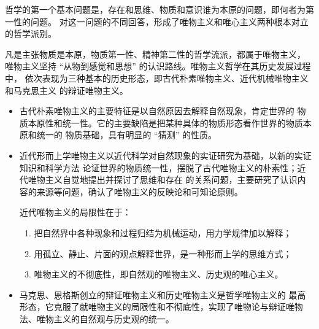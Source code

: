 \documentclass[utf-8, 10pt]{article}
\begin{document}
\vspace{1em}
{
哲学的第一个基本问题是，存在和思维、物质和意识谁为本原的问题，即何者为第一性的问题。
    对这一问题的不同回答，形成了唯物主义和唯心主义两种根本对立的哲学派别。
    
    
    凡是主张物质是本原，物质第一性、精神第二性的哲学流派，都属于唯物主义，
    唯物主义坚持 “从物到感觉和思想” 的认识路线。唯物主义哲学在其历史发展过程中，
    依次表现为三种基本的历史形态，即古代朴素唯物主义、近代机械唯物主义和马克思主义
    的辩证唯物主义。
    \begin{itemize}[itemsep=0pt]
        \item 古代朴素唯物主义的主要特征是以自然原因去解释自然现象，肯定世界的
        物质本原性和统一性。它的主要缺陷是把某种具体的物质形态看作世界的物质本原和统一的
        物质基础，具有明显的 “猜测” 的性质。
        \item 近代形而上学唯物主义以近代科学对自然现象的实证研究为基础，以新的实证知识和科学方法
        论证世界的物质统一性，摆脱了古代唯物主义的朴素性；近代唯物主义自觉地提出并探讨了思维和存在
        的关系问题，主要研究了认识内容的来源等问题，确认了唯物主义的反映论和可知论原则。
    
        近代唯物主义的局限性在于：
        \begin{enumerate}[label={${\arabic*}^\circ$}, itemsep=0pt]
            \item 把自然界中各种现象和过程归结为机械运动，用力学规律加以解释；
            \item 用孤立、静止、片面的观点解释世界，是一种形而上学的思维方式；
            \item 唯物主义的不彻底性，即自然观的唯物主义、历史观的唯心主义。
        \end{enumerate}
        \item 马克思、恩格斯创立的辩证唯物主义和历史唯物主义是哲学唯物主义的
        最高形态，它克服了就唯物主义的局限性和不彻底性，实现了唯物论与辩证唯物
        法、唯物主义的自然观与历史观的统一。
    \end{itemize}
    
    
}
\end{document}
